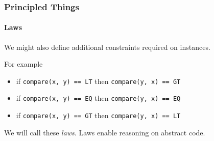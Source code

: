 \begin{frame}
\frametitle{Principled Things}
\framesubtitle{Laws}
We might also define additional constraints required on instances.
\begin{block}{For example}
\begin{itemize}
\item if \lstinline{compare(x, y) == LT} then \lstinline{compare(y, x) == GT}
\item if \lstinline{compare(x, y) == EQ} then \lstinline{compare(y, x) == EQ}
\item if \lstinline{compare(x, y) == GT} then \lstinline{compare(y, x) == LT}
\end{itemize}
\end{block}
We will call these \emph{laws}. Laws enable reasoning on abstract code.
\end{frame}
